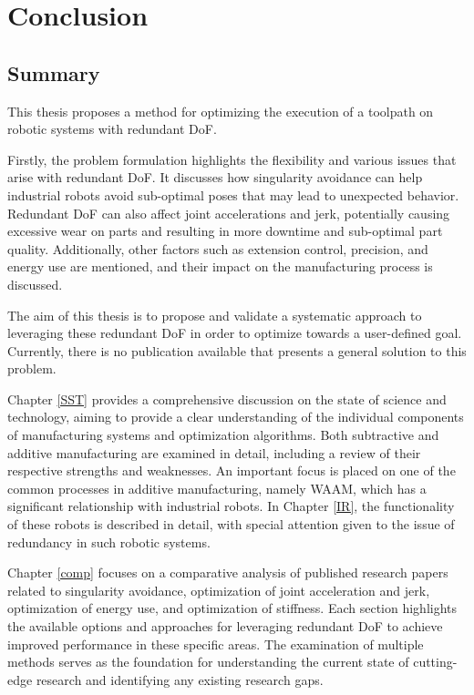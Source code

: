 \chapter{Conclusion}%

\section{Summary}%
This thesis proposes a method for optimizing the execution of a toolpath on robotic systems with redundant DoF.

Firstly, the problem formulation highlights the flexibility and various issues that arise with redundant DoF. It discusses how singularity avoidance can help industrial robots avoid sub-optimal poses that may lead to unexpected behavior. Redundant DoF can also affect joint accelerations and jerk, potentially causing excessive wear on parts and resulting in more downtime and sub-optimal part quality. Additionally, other factors such as extension control, precision, and energy use are mentioned, and their impact on the manufacturing process is discussed.

The aim of this thesis is to propose and validate a systematic approach to leveraging these redundant DoF in order to optimize towards a user-defined goal. Currently, there is no publication available that presents a general solution to this problem.


Chapter \ref{SST} provides a comprehensive discussion on the state of science and technology, aiming to provide a clear understanding of the individual components of manufacturing systems and optimization algorithms. Both subtractive and additive manufacturing are examined in detail, including a review of their respective strengths and weaknesses. An important focus is placed on one of the common processes in additive manufacturing, namely WAAM, which has a significant relationship with industrial robots. In Chapter \ref{IR}, the functionality of these robots is described in detail, with special attention given to the issue of redundancy in such robotic systems.

Chapter \ref{comp} focuses on a comparative analysis of published research papers related to singularity avoidance, optimization of joint acceleration and jerk, optimization of energy use, and optimization of stiffness. Each section highlights the available options and approaches for leveraging redundant DoF to achieve improved performance in these specific areas. The examination of multiple methods serves as the foundation for understanding the current state of cutting-edge research and identifying any existing research gaps.

